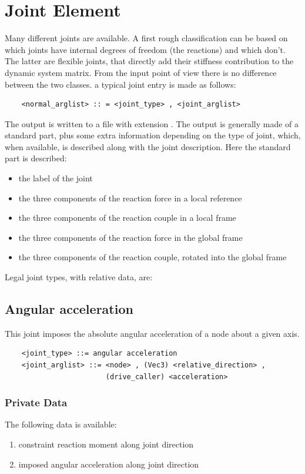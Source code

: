 \section{Joint Element}
Many different joints are available. A first rough classification can be
based on which joints have internal degrees of freedom (the reactions) and
which don't. The latter are flexible joints, that directly add their
stiffness contribution to the dynamic system matrix. From the input point
of view there is no difference between the two classes.
a typical joint entry is made as follows:
\begin{verbatim}
    <normal_arglist> :: = <joint_type> , <joint_arglist>
\end{verbatim}
The output is written to a file with extension .
The output is generally made of a standard part, plus some extra information
depending on the type of joint, which, when available, is described along
with the joint description.
Here the standard part is described:
\begin{itemize}
    \item the label of the joint
    \item the three components of the reaction force in a local reference
    \item the three components of the reaction couple in a local frame
    \item the three components of the reaction force in the global frame
    \item the three components of the reaction couple, rotated into the
          global frame
\end{itemize}
Legal joint types, with relative data, are:




\subsection{Angular acceleration}
This joint imposes the absolute angular acceleration of a node
about a given axis.
\begin{verbatim}
    <joint_type> ::= angular acceleration
    <joint_arglist> ::= <node> , (Vec3) <relative_direction> , 
                        (drive_caller) <acceleration>
\end{verbatim}

\subsubsection{Private Data}
The following data is available:
\begin{enumerate}
\item {} constraint reaction moment along joint direction
\item {} imposed angular acceleration along joint direction
\end{enumerate}




